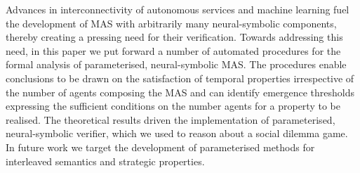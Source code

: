 Advances in interconnectivity of autonomous services and machine learning fuel
the development of MAS with arbitrarily many neural-symbolic components,
thereby creating a pressing need for their verification. Towards addressing
this need, in this paper we put forward a number of automated procedures for
the formal analysis of parameterised, neural-symbolic MAS. The procedures
enable conclusions to be drawn on the satisfaction of temporal properties
irrespective of the number of agents composing the MAS and can identify
emergence thresholds expressing the sufficient conditions on the number agents
for a property to be realised. The theoretical results driven the
implementation of parameterised, neural-symbolic verifier, which we used to
reason about a social dilemma game. In future work we target the development of
parameterised methods for interleaved semantics and strategic properties.

